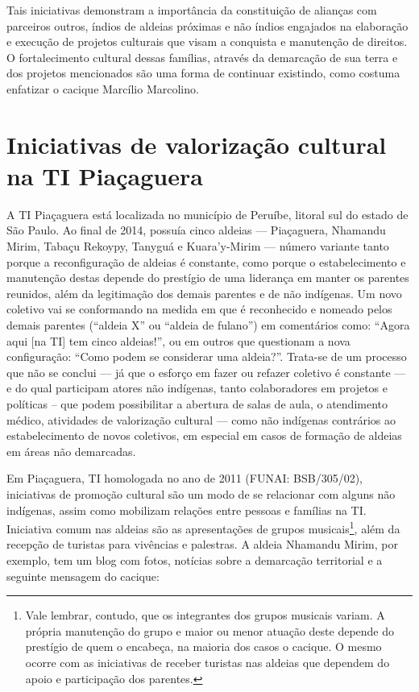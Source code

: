 Tais iniciativas demonstram a importância da constituição de alianças
com parceiros outros, índios de aldeias próximas e não índios engajados
na elaboração e execução de projetos culturais que visam a conquista e
manutenção de direitos. O fortalecimento cultural dessas famílias,
através da demarcação de sua terra e dos projetos mencionados são uma
forma de continuar existindo, como costuma enfatizar o cacique Marcílio
Marcolino.  

\section{Iniciativas de valorização cultural na TI Piaçaguera}

A TI Piaçaguera está localizada no município de Peruíbe, litoral sul do
estado de São Paulo. Ao final de 2014, possuía cinco aldeias —
Piaçaguera, Nhamandu Mirim, Tabaçu Rekoypy, Tanyguá e Kuara’y-Mirim —
número variante tanto porque a reconfiguração de aldeias é constante,
como porque o estabelecimento e manutenção destas depende do prestígio
de uma liderança em manter os parentes reunidos, além da legitimação
dos demais parentes e de não indígenas. Um novo coletivo vai se
conformando na medida em que é reconhecido e nomeado pelos demais
parentes (``aldeia X'' ou ``aldeia de fulano'') em comentários como: ``Agora
aqui [na TI] tem cinco aldeias!'', ou em outros que questionam a nova
configuração: ``Como podem se considerar uma aldeia?''. Trata-se de um
processo que não se conclui — já que o esforço em fazer ou refazer
coletivo é constante — e do qual participam atores não indígenas, tanto
colaboradores em projetos e políticas – que podem possibilitar a
abertura de salas de aula, o atendimento médico, atividades de
valorização cultural — como não indígenas contrários ao estabelecimento
de novos coletivos, em especial em casos de formação de aldeias em
áreas não demarcadas. 

Em Piaçaguera, TI homologada no ano de 2011 (FUNAI: BSB/305/02),
iniciativas de promoção cultural são um modo de se relacionar com
alguns não indígenas, assim como mobilizam relações entre pessoas e
famílias na TI. Iniciativa comum nas aldeias são as apresentações de
grupos musicais\footnote{Vale lembrar, contudo, que os integrantes dos
grupos musicais variam. A própria manutenção do grupo e maior ou menor
atuação deste depende do prestígio de quem o encabeça, na maioria dos
casos o cacique. O mesmo ocorre com as iniciativas de receber turistas
nas aldeias que dependem do apoio e participação dos parentes.}, além
da recepção de turistas para vivências e palestras. A aldeia Nhamandu
Mirim, por exemplo, tem um blog com fotos, notícias sobre a demarcação
territorial e a seguinte mensagem do cacique:

